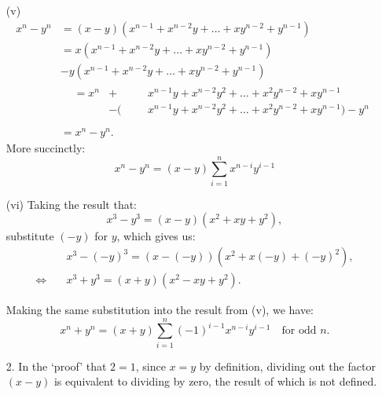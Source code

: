 \documentclass[11pt]{article}
\begin{document}
\begin{enumerate}
    \item[(v)]
          \[
              \begin{aligned}
                  x^n - y^n & = (x - y)(x^{n - 1} + x^{n - 2} y + \dots + xy^{n - 2} + y^{n - 1})                                \\[6pt]
                            & = x (x^{n - 1} + x^{n - 2}y + \dots + xy^{n - 2} + y^{n - 1})                                      \\
                            & - y (x^{n - 1} + x^{n - 2}y + \dots + xy^{n - 2} + y^{n - 1})                                      \\[6pt]
                            & \begin{alignedat}{3}
                                   & = x^{n} & +  \, &  &  & x^{n - 1}y + x^{n - 2}y^2 + \dots + x^2y^{n - 2} + xy^{n - 1}           \\
                                   &         & - (   &  &  & x^{n - 1}y + x^{n - 2}y^2 + \dots + x^2y^{n - 2} + xy^{n - 1} ) - y^{n} \\
                              \end{alignedat}
                  \\[6pt]
                            & = x^n - y^n.
              \end{aligned}
          \]
          More succinctly:
          \[
              x^n - y^n = (x - y)
              \sum_{i=1}^{n} x^{n - i} y^{i - 1}
          \]

    \item[(vi)] Taking the result that:
          \[
              x^3 - y^3 = (x - y)(x^2 + xy + y^2),
          \]
          substitute $(-y)$ for $y$, which gives us:
          \[
              \begin{aligned}
                             & x^3 - (-y)^3 = (x - (-y))(x^2 + x(-y) + (-y)^2), \\
                  \iff \quad & x^3 + y^3 = (x + y)(x^2 - xy + y^2).
              \end{aligned}
          \]

          Making the same substitution into the result from (v), we have:
          \[
              x^n + y^n = (x + y)
              \sum_{i = 1}^{n} (-1)^{i - 1} x^{n - i} y^{i - 1}
              \quad
              \text{for odd $n$}.
          \]

    \item[2.] In the `proof' that $2 = 1$, since $x = y$ by definition, dividing out the factor $(x
              - y)$ is equivalent to dividing by zero, the result of which is not defined.


\end{enumerate}
\end{document}
